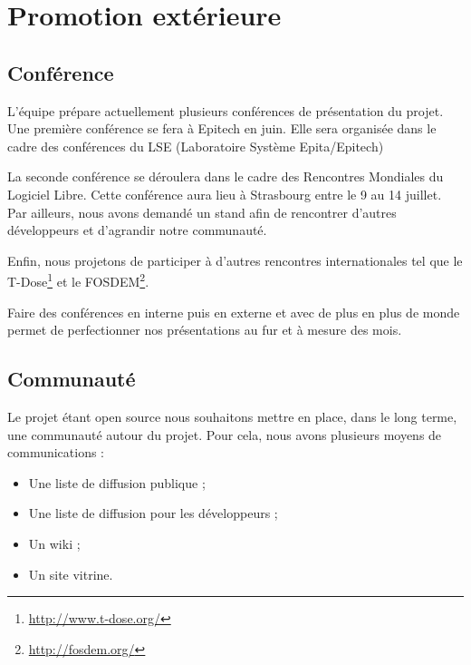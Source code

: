 \documentclass[francais]{rtxreport}
\begin{document}


\chapter{Promotion extérieure}



\section{Conférence}

L'équipe prépare actuellement plusieurs conférences de présentation du projet.
Une première conférence se fera à Epitech en juin. Elle sera organisée dans le
cadre des conférences du LSE (Laboratoire Système Epita/Epitech)

La seconde conférence se déroulera dans le cadre des Rencontres Mondiales du
Logiciel Libre. Cette conférence aura lieu à Strasbourg entre le 9 au 14
juillet. Par ailleurs, nous avons demandé un stand afin de rencontrer d'autres
développeurs et d'agrandir notre communauté.

Enfin, nous projetons de participer à d'autres rencontres internationales tel
que le T-Dose\footnote{\url{http://www.t-dose.org/}} et le FOSDEM\footnote{\url{http://fosdem.org/}}.

Faire des conférences en interne puis en externe et avec de plus en plus de
monde permet de perfectionner nos présentations au fur et à mesure des mois. %



\section{Communauté}

Le projet étant open source nous souhaitons mettre en place, dans le long terme,
une communauté autour du projet. Pour cela, nous avons plusieurs
moyens de communications :

\begin{itemize}
\item Une liste de diffusion publique ; %
\item Une liste de diffusion pour les développeurs ; %
\item Un wiki ; %
\item Un site vitrine. %
\end{itemize}
\end{document}
